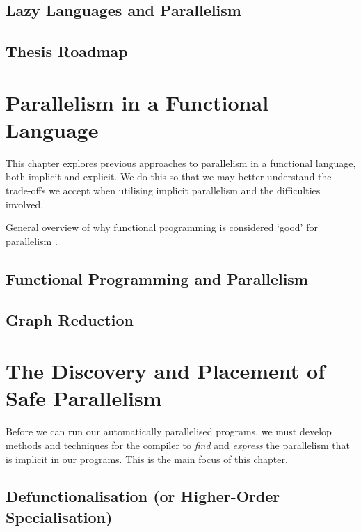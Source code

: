 \documentclass[justified]{tufte-book}
\begin{document}
    \section{Lazy Languages and Parallelism}
    



    \section{Thesis Roadmap}

\chapter{Parallelism in a Functional Language}

    This chapter explores previous approaches to parallelism in a
    functional language, both implicit and explicit. We do this so that
    we may better understand the trade-offs we accept when utilising
    implicit parallelism and the difficulties involved.


    General overview of why functional programming is considered `good' for
    parallelism \citep{hughes:thesis}.
    \section{Functional Programming and Parallelism}
    
    
    \section{Graph Reduction}
    

\chapter{The Discovery and Placement of Safe Parallelism}

    Before we can run our automatically parallelised programs, we must develop
    methods and techniques for the compiler to \emph{find} and \emph{express}
    the parallelism that is implicit in our programs. This is the main focus
    of this chapter.

    \section{Defunctionalisation (or Higher-Order Specialisation)}
    
\end{document}
